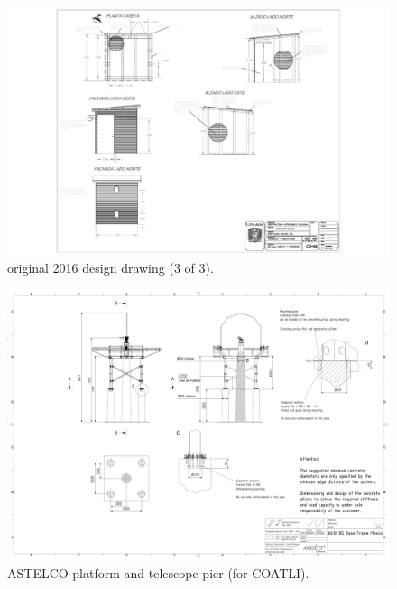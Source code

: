 \begin{figure}
\begin{center}
\includegraphics[height=0.75\linewidth,angle=90]{figures/buildings-ddoti-drawing-2016-3.pdf}
\end{center}
\caption{{\projectname} original 2016 design drawing (3 of 3).}
\label{figure:buildings-drawing-2016-3}
\end{figure}

\begin{figure}
\begin{center}
\includegraphics[height=0.75\linewidth,angle=90]{figures/buildings-ddoti-astelco-enclosure-drawing-6610}
\end{center}
\caption{{\projectname} ASTELCO platform and telescope pier (for COATLI).}
\label{figure:buildings-drawing-astelco}
\end{figure}

